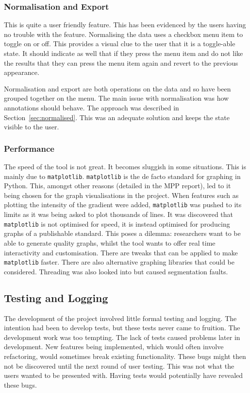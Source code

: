 \subsubsection{Normalisation and Export}

This is quite a user friendly feature.  This has been evidenced by the users having no trouble with the feature.  Normalising the data uses a checkbox menu item to toggle on or off.  This provides a visual clue to the user that it is a toggle-able state.  It should indicate as well that if they press the menu item and do not like the results that they can press the menu item again and revert to the previous appearance.

Normalisation and export are both operations on the data and so have been grouped together on the menu.  The main issue with normalisation was how annotations should behave.  The approach was described in Section~\ref{sec:normalised}.  This was an adequate solution and keeps the state visible to the user.

\subsubsection{Performance}

The speed of the tool is not great.  It becomes sluggish in some situations.  This is mainly due to \texttt{matplotlib}.  \texttt{matplotlib} is the de facto standard for graphing in Python. This, amongst other reasons (detailed in the MPP report), led to it being chosen for the graph visualisations in the project.  When features such as plotting the intensity of the gradient were added, \texttt{matplotlib} was pushed to its limits as it was being asked to plot thousands of lines.  It was discovered that \texttt{matplotlib} is not optimised for speed, it is instead optimised for producing graphs of a publishable standard.  This poses a dilemma: researchers want to be able to generate quality graphs, whilst the tool wants to offer real time interactivity and customisation.  There are tweaks that can be applied to make \texttt{matplotlib} faster. There are also alternative graphing libraries that could be considered.  Threading was also looked into but caused segmentation faults.

\subsection{Testing and Logging}

The development of the project involved little formal testing and logging.  The intention had been to develop tests, but these tests never came to fruition.  The development work was too tempting. The lack of tests caused problems later in development.  New features being implemented, which would often involve refactoring, would sometimes break existing functionality.  These bugs might then not be discovered until the next round of user testing.  This was not what the users wanted to be presented with.  Having tests would potentially have revealed these bugs.

